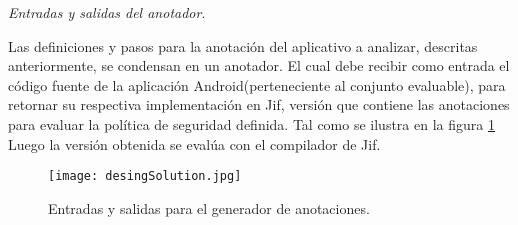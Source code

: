 \textit{Entradas y salidas del anotador}.

Las definiciones y pasos para la anotación del aplicativo a analizar, descritas
anteriormente, se condensan en un anotador. El cual debe recibir como entrada el
código fuente de la aplicación Android(perteneciente al conjunto evaluable),
para retornar su respectiva implementación en Jif, versión que contiene las
anotaciones para evaluar la política de seguridad definida. Tal como se ilustra
en la figura \ref{fig:desingSolution}\newline 
Luego la versión obtenida se evalúa con el compilador de Jif.
\label{subsec:anotador}
\label{subsec:pasosSol}
\begin{figure}[H]
	\begin{center}
	\texttt{[image: desingSolution.jpg]}
	\end{center}
	\caption{Entradas y salidas para el generador de anotaciones.}
	\label{fig:desingSolution} 
\end{figure}

